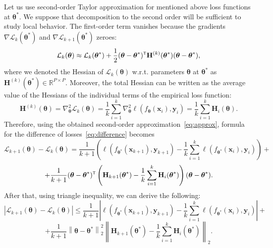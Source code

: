 \documentclass{article}
\begin{document}
Let us use second-order Taylor approximation for mentioned above loss functions at $\boldsymbol{\theta}^*$. We suppose that decomposition to the second order will be sufficient to study local behavior. The first-order term vanishes because the gradients $\nabla \mathcal{L}_{k}(\boldsymbol{\theta}^*)$ and $\nabla \mathcal{L}_{k+1}(\boldsymbol{\theta}^*)$ zeroes:
\begin{equation}\label{eq:approx}
    \mathcal{L}_{k}(\boldsymbol{\theta}) \approx \mathcal{L}_{k}(\boldsymbol{\theta}^*) + \dfrac{1}{2} (\boldsymbol{\theta} - \boldsymbol{\theta}^*)\T \mathbf{H}^{(k)}(\boldsymbol{\theta}^*) (\boldsymbol{\theta} - \boldsymbol{\theta}^*),
\end{equation}
where we denoted the Hessian of $\mathcal{L}_{k}(\boldsymbol{\theta})$ w.r.t. parameters $\boldsymbol{\theta}$ at $\boldsymbol{\theta}^*$ as $\mathbf{H}^{(k)}(\boldsymbol{\theta}^*) \in \mathbb{R}^{P \times P}$. Moreover, the total Hessian can be written as the average value of the Hessians of the individual terms of the empirical loss function:
\[ \mathbf{H}^{(k)}(\boldsymbol{\theta}) = \nabla^2_{\boldsymbol{\theta}} \mathcal{L}_{k}(\boldsymbol{\theta}) = \dfrac{1}{k} \sum\limits_{i=1}^{k} \nabla^2_{\boldsymbol{\theta}} \ell(f_{\boldsymbol{\theta}}(\mathbf{x}_{i}), \mathbf{y}_{i}) = \dfrac{1}{k} \sum\limits_{i=1}^{k} \mathbf{H}_{i}(\boldsymbol{\theta}). \]
Therefore, using the obtained second-order approximation~\eqref{eq:approx}, formula for the difference of losses~\eqref{eq:difference} becomes
\[ \mathcal{L}_{k+1}(\boldsymbol{\theta}) - \mathcal{L}_k(\boldsymbol{\theta}) = \dfrac{1}{k+1} \left( \ell(f_{\boldsymbol{\theta}^*}(\mathbf{x}_{k+1}), \mathbf{y}_{k+1}) - \dfrac{1}{k} \sum\limits_{i=1}^{k} \ell(f_{\boldsymbol{\theta}^*}(\mathbf{x}_{i}), \mathbf{y}_{i}) \right) + \]
\[ + \dfrac{1}{k+1} (\boldsymbol{\theta} - \boldsymbol{\theta}^*)\T \left( \mathbf{H}_{k+1}(\boldsymbol{\theta}^*) - \dfrac{1}{k} \sum\limits_{i=1}^{k} \mathbf{H}_{i}(\boldsymbol{\theta}^*) \right) (\boldsymbol{\theta} - \boldsymbol{\theta}^*). \]
After that, using triangle inequality, we can derive the following:
\[ \left| \mathcal{L}_{k+1}(\boldsymbol{\theta}) - \mathcal{L}_k(\boldsymbol{\theta}) \right| \leqslant \dfrac{1}{k+1} \left| \ell(f_{\boldsymbol{\theta}^*}(\mathbf{x}_{k+1}), \mathbf{y}_{k+1}) - \dfrac{1}{k} \sum\limits_{i=1}^{k} \ell(f_{\boldsymbol{\theta}^*}(\mathbf{x}_{i}), \mathbf{y}_{i}) \right| + \]
\[ + \dfrac{1}{k+1} \left\|\boldsymbol{\theta} - \boldsymbol{\theta}^*\right\|_2^2 \left\| \mathbf{H}_{k+1}(\boldsymbol{\theta}^*) - \dfrac{1}{k} \sum\limits_{i=1}^{k} \mathbf{H}_{i}(\boldsymbol{\theta}^*) \right\|_2. \]
\end{document}

